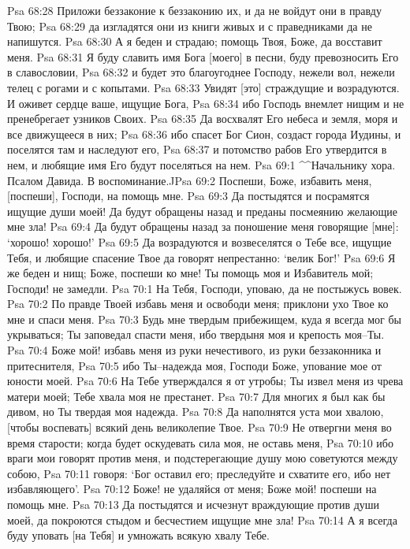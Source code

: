 Psa 68:28  Приложи беззаконие к беззаконию их, и да не войдут они в правду Твою;
Psa 68:29  да изгладятся они из книги живых и с праведниками да не напишутся.
Psa 68:30  А я беден и страдаю; помощь Твоя, Боже, да восставит меня.
Psa 68:31  Я буду славить имя Бога [моего] в песни, буду превозносить Его в славословии,
Psa 68:32  и будет это благоугоднее Господу, нежели вол, нежели телец с рогами и с копытами.
Psa 68:33  Увидят [это] страждущие и возрадуются. И оживет сердце ваше, ищущие Бога,
Psa 68:34  ибо Господь внемлет нищим и не пренебрегает узников Своих.
Psa 68:35  Да восхвалят Его небеса и земля, моря и все движущееся в них;
Psa 68:36  ибо спасет Бог Сион, создаст города Иудины, и поселятся там и наследуют его,
Psa 68:37  и потомство рабов Его утвердится в нем, и любящие имя Его будут поселяться на нем.
Psa 69:1  ^^Начальнику хора. Псалом Давида. В воспоминание.^^
Psa 69:2  Поспеши, Боже, избавить меня, [поспеши], Господи, на помощь мне.
Psa 69:3  Да постыдятся и посрамятся ищущие души моей! Да будут обращены назад и преданы посмеянию желающие мне зла!
Psa 69:4  Да будут обращены назад за поношение меня говорящие [мне]: `хорошо! хорошо!'
Psa 69:5  Да возрадуются и возвеселятся о Тебе все, ищущие Тебя, и любящие спасение Твое да говорят непрестанно: `велик Бог!'
Psa 69:6  Я же беден и нищ; Боже, поспеши ко мне! Ты помощь моя и Избавитель мой; Господи! не замедли.
Psa 70:1  На Тебя, Господи, уповаю, да не постыжусь вовек.
Psa 70:2  По правде Твоей избавь меня и освободи меня; приклони ухо Твое ко мне и спаси меня.
Psa 70:3  Будь мне твердым прибежищем, куда я всегда мог бы укрываться; Ты заповедал спасти меня, ибо твердыня моя и крепость моя--Ты.
Psa 70:4  Боже мой! избавь меня из руки нечестивого, из руки беззаконника и притеснителя,
Psa 70:5  ибо Ты--надежда моя, Господи Боже, упование мое от юности моей.
Psa 70:6  На Тебе утверждался я от утробы; Ты извел меня из чрева матери моей; Тебе хвала моя не престанет.
Psa 70:7  Для многих я был как бы дивом, но Ты твердая моя надежда.
Psa 70:8  Да наполнятся уста мои хвалою, [чтобы воспевать] всякий день великолепие Твое.
Psa 70:9  Не отвергни меня во время старости; когда будет оскудевать сила моя, не оставь меня,
Psa 70:10  ибо враги мои говорят против меня, и подстерегающие душу мою советуются между собою,
Psa 70:11  говоря: `Бог оставил его; преследуйте и схватите его, ибо нет избавляющего'.
Psa 70:12  Боже! не удаляйся от меня; Боже мой! поспеши на помощь мне.
Psa 70:13  Да постыдятся и исчезнут враждующие против души моей, да покроются стыдом и бесчестием ищущие мне зла!
Psa 70:14  А я всегда буду уповать [на Тебя] и умножать всякую хвалу Тебе.
